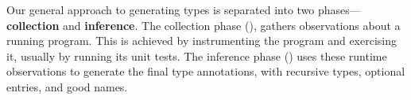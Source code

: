 %
%
%
%
%


%
Our general approach to generating types
is separated into two phases---\textbf{collection} and
\textbf{inference}.
%
The collection phase (),
gathers observations about a running program.
This is achieved by instrumenting the program and exercising
it, usually by running its unit tests.
%
The inference phase ()
uses these runtime observations to generate the final type annotations,
with recursive types, optional entries, and good names.

